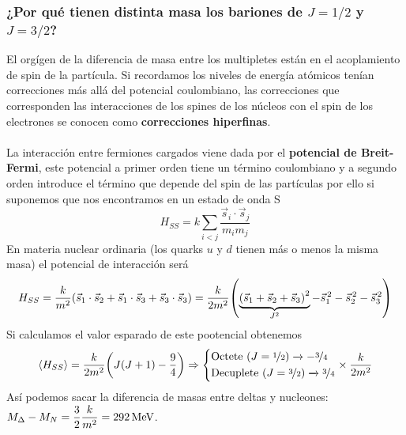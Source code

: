 \subsubsection{¿Por qué tienen distinta masa los bariones de $J=1/2$ y $J=3/2$?}
El orgígen de la diferencia de masa entre los multipletes están en el acoplamiento de spin de la partícula.\newpage
Si recordamos los niveles de energía atómicos tenían correcciones más allá del potencial coulombiano, las correcciones que corresponden las interacciones de los  spines de los núcleos con el spin de los electrones se conocen como \textbf{correcciones hiperfinas}.\\\\
La interacción entre fermiones cargados viene dada por el \textbf{potencial de Breit-Fermi}, este potencial a primer orden tiene un término coulombiano y a segundo orden introduce el término que depende del spin de las partículas por ello si suponemos que nos encontramos en un estado de onda S
\begin{equation}
H_{SS}=k\sum_{i<j}    \frac{\vec{s}_i\cdot \vec{s}_j}{m_im_j}
\label{eq: potencial de fermi-breit}
\end{equation}
En materia nuclear ordinaria (los quarks $u$ y $d$ tienen más o menos la misma masa) el potencial de interacción será 
\begin{equation*}
    H_{SS}=\frac{k}{m^2}\qty(\vec{s}_1\cdot \vec{s}_2+\vec{s}_1\cdot \vec{s}_3+\vec{s}_3\cdot \vec{s}_3)=\frac{k}{2m^2}\qty(\underbrace{\qty(\vec{s}_1+\vec{s}_2+\vec{s}_3)^2}_{J^2}-\vec{s}_1^{\,2}-\vec{s}_2^{\,2}-\vec{s}_3^{\,2})
\end{equation*} 
Si calculamos el valor esparado de este pootencial obtenemos 
\begin{equation*}
    \expval{H_{SS}}=\frac{k}{2m^2}\qty(J(J+1)-\frac{9}{4})\Rightarrow \left \{ \begin{aligned}
        & \mathrm{Octete} \ (J=\nicefrac{1}{2}) \xrightarrow{} -\nicefrac{3}{4}\\
        & \mathrm{Decuplete} \ (J=\nicefrac{3}{2}) \xrightarrow{} \nicefrac{3}{4}
    \end{aligned} \right. \times \frac{k}{2m^2}
\end{equation*}
Así podemos sacar la diferencia de masas entre deltas y nucleones: $M_\Delta-M_N= \dfrac{3}{2}\dfrac{k}{m^2}=\unit[292]{MeV}$.

